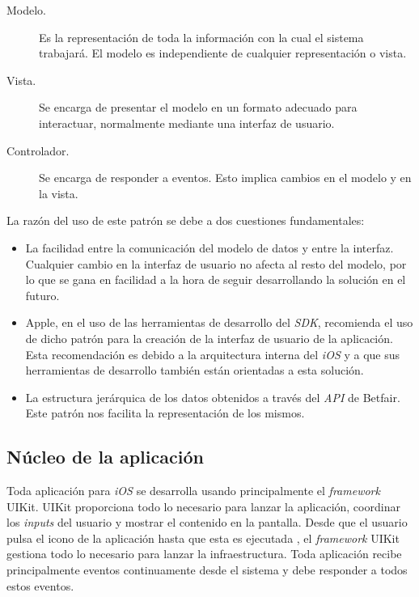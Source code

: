 \begin{description}
 	\item [Modelo.] Es la representación de toda la información con la cual el sistema trabajará. El modelo es independiente de cualquier representación o vista.
	\item [Vista.] Se encarga de presentar el modelo en un formato adecuado para interactuar, normalmente mediante una interfaz de usuario.
	\item [Controlador.] Se encarga de responder a eventos. Esto implica cambios en el modelo y en la vista.
\end{description}
 
  La razón del uso de este patrón se debe a dos cuestiones fundamentales:
\begin{itemize}
	\item La facilidad entre la comunicación del modelo de datos y entre la interfaz. Cualquier cambio en la interfaz de usuario no afecta al resto del modelo, por lo que se gana en facilidad a la hora de seguir desarrollando la solución en el futuro.
	\item Apple, en el uso de las herramientas de desarrollo del \emph{SDK}, recomienda el uso de dicho patrón para la creación de la interfaz de usuario de la aplicación. Esta recomendación es debido a la arquitectura interna del \emph{iOS} y a que sus herramientas de desarrollo también están orientadas a esta solución.
	\item La estructura jerárquica de los datos obtenidos a través del \emph{API} de Betfair. Este patrón nos facilita la representación de los mismos.
\end{itemize}


\subsection{Núcleo de la aplicación}
	Toda aplicación para \emph{iOS} se desarrolla usando principalmente el \emph{framework} UIKit. UIKit proporciona todo lo necesario para lanzar la aplicación, coordinar los \emph{inputs} del usuario y mostrar el contenido en la pantalla. 
	Desde que el usuario pulsa el icono de la aplicación hasta que esta es ejecutada , el \emph{framework} UIKit gestiona todo lo necesario para lanzar la infraestructura. Toda aplicación recibe principalmente eventos continuamente desde el sistema y debe responder a todos estos eventos. 
	
